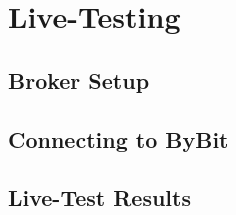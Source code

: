 \section{Live-Testing}

\subsection{Broker Setup}

\subsection{Connecting to ByBit}

\subsection{Live-Test Results}